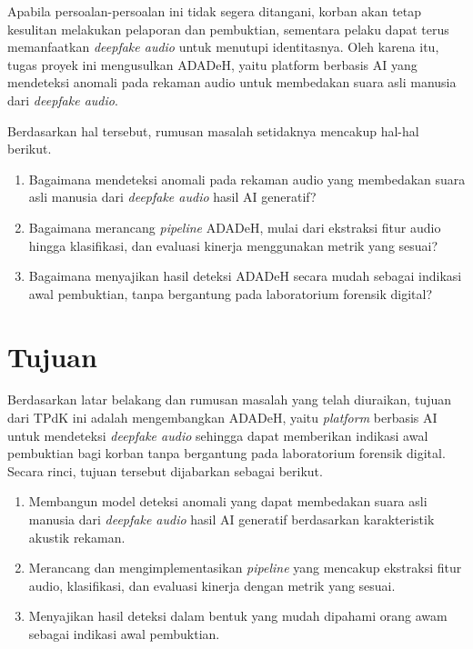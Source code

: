 Apabila persoalan-persoalan ini tidak segera ditangani, korban akan tetap kesulitan melakukan pelaporan dan pembuktian, sementara pelaku dapat terus memanfaatkan \textit{deepfake audio} untuk menutupi identitasnya. Oleh karena itu, tugas proyek ini mengusulkan ADADeH, yaitu platform berbasis AI yang mendeteksi anomali pada rekaman audio untuk membedakan suara asli manusia dari \textit{deepfake audio}. 

Berdasarkan hal tersebut, rumusan masalah setidaknya mencakup hal-hal berikut.
\begin{enumerate}
\item	Bagaimana mendeteksi anomali pada rekaman audio yang membedakan suara asli manusia dari \textit{deepfake audio} hasil AI generatif?
\item	Bagaimana merancang \textit{pipeline} ADADeH, mulai dari ekstraksi fitur audio hingga klasifikasi, dan evaluasi kinerja menggunakan metrik yang sesuai?
\item	Bagaimana menyajikan hasil deteksi ADADeH secara mudah sebagai indikasi awal pembuktian, tanpa bergantung pada laboratorium forensik digital?
\end{enumerate}

\section{Tujuan}
Berdasarkan latar belakang dan rumusan masalah yang telah diuraikan, tujuan dari TPdK ini adalah mengembangkan ADADeH, yaitu \textit{platform} berbasis AI untuk mendeteksi \textit{deepfake audio} sehingga dapat memberikan indikasi awal pembuktian bagi korban tanpa bergantung pada laboratorium forensik digital. Secara rinci, tujuan tersebut dijabarkan sebagai berikut.
\begin{enumerate}
\item	Membangun model deteksi anomali yang dapat membedakan suara asli manusia dari \textit{deepfake audio} hasil AI generatif berdasarkan karakteristik akustik rekaman.
\item	Merancang dan mengimplementasikan \textit{pipeline} yang mencakup ekstraksi fitur audio, klasifikasi, dan evaluasi kinerja dengan metrik yang sesuai.
\item	Menyajikan hasil deteksi dalam bentuk yang mudah dipahami orang awam sebagai indikasi awal pembuktian.
\end{enumerate}

